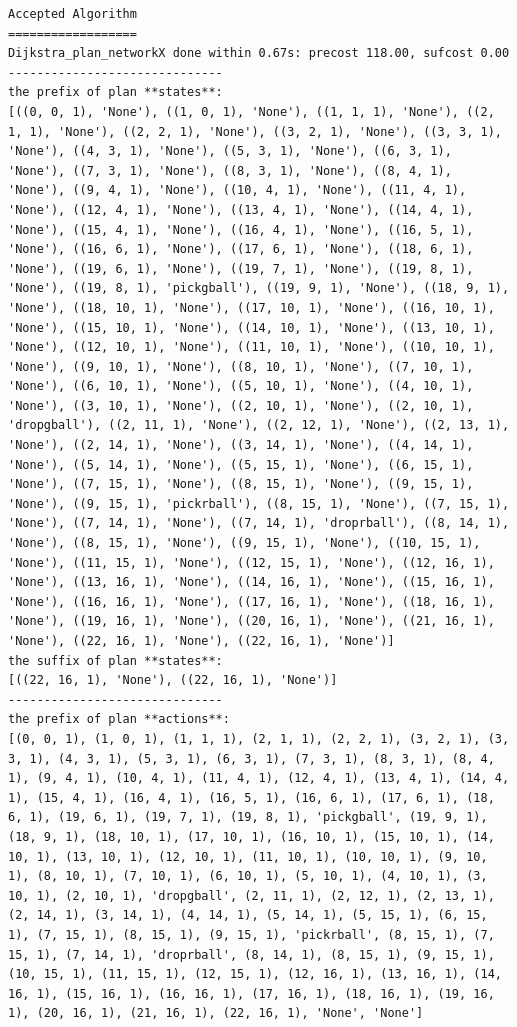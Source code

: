 \begin{lstlisting}
Accepted Algorithm
==================
Dijkstra_plan_networkX done within 0.67s: precost 118.00, sufcost 0.00
------------------------------
the prefix of plan **states**:
[((0, 0, 1), 'None'), ((1, 0, 1), 'None'), ((1, 1, 1), 'None'), ((2, 1, 1), 'None'), ((2, 2, 1), 'None'), ((3, 2, 1), 'None'), ((3, 3, 1), 'None'), ((4, 3, 1), 'None'), ((5, 3, 1), 'None'), ((6, 3, 1), 'None'), ((7, 3, 1), 'None'), ((8, 3, 1), 'None'), ((8, 4, 1), 'None'), ((9, 4, 1), 'None'), ((10, 4, 1), 'None'), ((11, 4, 1), 'None'), ((12, 4, 1), 'None'), ((13, 4, 1), 'None'), ((14, 4, 1), 'None'), ((15, 4, 1), 'None'), ((16, 4, 1), 'None'), ((16, 5, 1), 'None'), ((16, 6, 1), 'None'), ((17, 6, 1), 'None'), ((18, 6, 1), 'None'), ((19, 6, 1), 'None'), ((19, 7, 1), 'None'), ((19, 8, 1), 'None'), ((19, 8, 1), 'pickgball'), ((19, 9, 1), 'None'), ((18, 9, 1), 'None'), ((18, 10, 1), 'None'), ((17, 10, 1), 'None'), ((16, 10, 1), 'None'), ((15, 10, 1), 'None'), ((14, 10, 1), 'None'), ((13, 10, 1), 'None'), ((12, 10, 1), 'None'), ((11, 10, 1), 'None'), ((10, 10, 1), 'None'), ((9, 10, 1), 'None'), ((8, 10, 1), 'None'), ((7, 10, 1), 'None'), ((6, 10, 1), 'None'), ((5, 10, 1), 'None'), ((4, 10, 1), 'None'), ((3, 10, 1), 'None'), ((2, 10, 1), 'None'), ((2, 10, 1), 'dropgball'), ((2, 11, 1), 'None'), ((2, 12, 1), 'None'), ((2, 13, 1), 'None'), ((2, 14, 1), 'None'), ((3, 14, 1), 'None'), ((4, 14, 1), 'None'), ((5, 14, 1), 'None'), ((5, 15, 1), 'None'), ((6, 15, 1), 'None'), ((7, 15, 1), 'None'), ((8, 15, 1), 'None'), ((9, 15, 1), 'None'), ((9, 15, 1), 'pickrball'), ((8, 15, 1), 'None'), ((7, 15, 1), 'None'), ((7, 14, 1), 'None'), ((7, 14, 1), 'droprball'), ((8, 14, 1), 'None'), ((8, 15, 1), 'None'), ((9, 15, 1), 'None'), ((10, 15, 1), 'None'), ((11, 15, 1), 'None'), ((12, 15, 1), 'None'), ((12, 16, 1), 'None'), ((13, 16, 1), 'None'), ((14, 16, 1), 'None'), ((15, 16, 1), 'None'), ((16, 16, 1), 'None'), ((17, 16, 1), 'None'), ((18, 16, 1), 'None'), ((19, 16, 1), 'None'), ((20, 16, 1), 'None'), ((21, 16, 1), 'None'), ((22, 16, 1), 'None'), ((22, 16, 1), 'None')]
the suffix of plan **states**:
[((22, 16, 1), 'None'), ((22, 16, 1), 'None')]
------------------------------
the prefix of plan **actions**:
[(0, 0, 1), (1, 0, 1), (1, 1, 1), (2, 1, 1), (2, 2, 1), (3, 2, 1), (3, 3, 1), (4, 3, 1), (5, 3, 1), (6, 3, 1), (7, 3, 1), (8, 3, 1), (8, 4, 1), (9, 4, 1), (10, 4, 1), (11, 4, 1), (12, 4, 1), (13, 4, 1), (14, 4, 1), (15, 4, 1), (16, 4, 1), (16, 5, 1), (16, 6, 1), (17, 6, 1), (18, 6, 1), (19, 6, 1), (19, 7, 1), (19, 8, 1), 'pickgball', (19, 9, 1), (18, 9, 1), (18, 10, 1), (17, 10, 1), (16, 10, 1), (15, 10, 1), (14, 10, 1), (13, 10, 1), (12, 10, 1), (11, 10, 1), (10, 10, 1), (9, 10, 1), (8, 10, 1), (7, 10, 1), (6, 10, 1), (5, 10, 1), (4, 10, 1), (3, 10, 1), (2, 10, 1), 'dropgball', (2, 11, 1), (2, 12, 1), (2, 13, 1), (2, 14, 1), (3, 14, 1), (4, 14, 1), (5, 14, 1), (5, 15, 1), (6, 15, 1), (7, 15, 1), (8, 15, 1), (9, 15, 1), 'pickrball', (8, 15, 1), (7, 15, 1), (7, 14, 1), 'droprball', (8, 14, 1), (8, 15, 1), (9, 15, 1), (10, 15, 1), (11, 15, 1), (12, 15, 1), (12, 16, 1), (13, 16, 1), (14, 16, 1), (15, 16, 1), (16, 16, 1), (17, 16, 1), (18, 16, 1), (19, 16, 1), (20, 16, 1), (21, 16, 1), (22, 16, 1), 'None', 'None']

\end{lstlisting}
